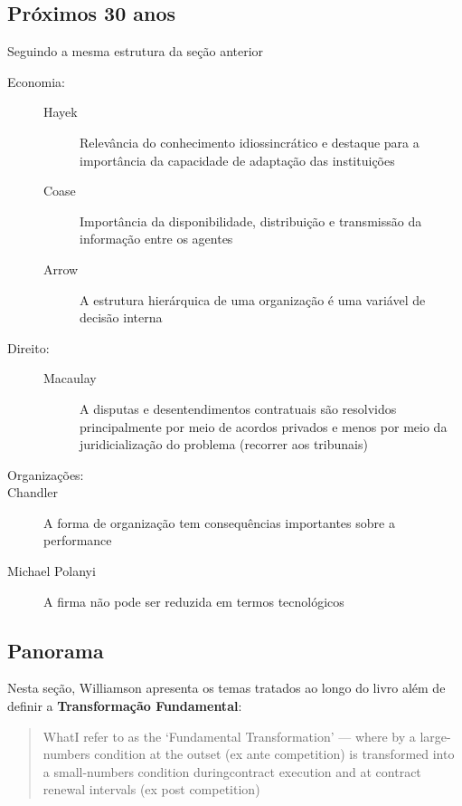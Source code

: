\subsection*{Próximos 30 anos}

Seguindo a mesma estrutura da seção anterior

\begin{description}
	\item[Economia:] {\color{white}{bla}}
	\begin{description}
		\item[Hayek] Relevância do conhecimento idiossincrático e destaque para a importância da capacidade de adaptação das instituições
		\item[Coase] Importância da disponibilidade, distribuição e transmissão da informação entre os agentes
		\item[Arrow] A estrutura hierárquica de uma organização é uma variável de decisão interna
	\end{description}
	\item[Direito:] {\color{white}{bla}}
	\begin{description}
		\item[Macaulay] A disputas e desentendimentos contratuais são resolvidos principalmente por meio de acordos privados e menos por meio da juridicialização do problema (recorrer aos tribunais)
	\end{description}
	\item[Organizações:] {\color{white}{bla}}
	\item[Chandler] A forma de organização tem consequências importantes sobre a performance
	\item[Michael Polanyi] A firma não pode ser reduzida em termos tecnológicos
\end{description}


\subsection*{Panorama}

Nesta seção, Williamson apresenta os temas tratados ao longo do livro além de definir a \textbf{Transformação Fundamental}:

\begin{quotation}
	WhatI refer to as the `Fundamental Transformation' --- where by a large-numbers condition at the outset	(ex ante competition) is transformed into a small-numbers condition duringcontract execution and at contract renewal intervals (ex post competition)
\end{quotation}



